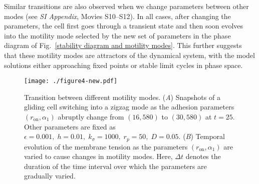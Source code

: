 \documentclass[12pt]{article}
\begin{document}
Similar transitions are also observed when we change parameters between other modes (see \textit{SI Appendix}, Movies S10--S12). 
In all cases, after changing the parameters, the cell first goes through a transient state and then soon evolves into the motility mode selected by the new set of parameters in the phase diagram of Fig.~\ref{stability diagram and motility modes}. 
This further suggests that these motility modes are attractors of the dynamical system, with the model solutions either approaching fixed points or stable limit cycles in phase space. 
        \begin{figure}[t]
            \centering
            \texttt{[image: ./figure4-new.pdf]}
            \caption{Transition between different motility modes. (\textit{A}) Snapshots of a gliding cell switching into a zigzag mode as the adhesion parameters $(r_\text{on},\alpha_1)$ abruptly change from $(16,580)$ to $(30,580)$ at $t=25$. Other parameters are fixed as $\epsilon = 0.001,\;h = 0.01,\;k_\sigma = 1000,\; r_p = 50,\;D=0.05$.  (\textit{B}) Temporal evolution of the membrane tension as the parameters $(r_\text{on},\alpha_1)$ are varied to cause changes in motility modes. Here, $\Delta t$ denotes the duration of the time interval over which the parameters are gradually varied. }
            \label{tansition}
        \end{figure}
\end{document}
